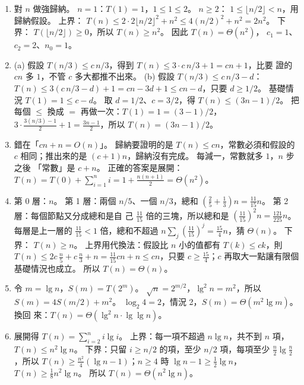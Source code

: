 \begin{enumerate}
\item 對 $n$ 做強歸納。 $n = 1$：$T(1) = 1$，$1 \le 1 \le 2$。 $n \ge 2$：
$1 \le \lfloor n/2 \rfloor < n$，用歸納假設。 上界：
$T(n) \le 2 \cdot 2\lfloor n/2 \rfloor^2 + n^2 \le 4 (n/2)^2 + n^2 = 2n^2$。 下界：
$T(\lfloor n/2 \rfloor) \ge 0$，所以 $T(n) \ge n^2$。 因此 $T(n) = \Theta(n^2)$，
$c_1 = 1$、$c_2 = 2$、$n_0 = 1$。

\item (a) 假設 $T(n/3) \le c\,n/3$，得到 $T(n) \le 3 \cdot c\,n/3 + 1 = cn + 1$，比要
證的 $cn$ 多 $1$，不管 $c$ 多大都推不出來。 (b) 假設 $T(n/3) \le c\,n/3 - d$：
$T(n) \le 3(c\,n/3 - d) + 1 = cn - 3d + 1 \le cn - d$，只要 $d \ge 1/2$。 基礎情況
$T(1) = 1 \le c - d$。 取 $d = 1/2$、$c = 3/2$，得 $T(n) \le (3n - 1)/2$。 把每個
$\le$ 換成 $=$ 再做一次：$T(1) = 1 = (3 - 1)/2$，
$3 \cdot \frac{3(n/3) - 1}{2} + 1 = \frac{3n - 1}{2}$，所以 $T(n) = (3n - 1)/2$。

\item 錯在「$cn + n = O(n)$」。 歸納要證明的是 $T(n) \le cn$，常數必須和假設的
$c$ 相同；推出來的是 $(c + 1) n$，歸納沒有完成。 每減一，常數就多 $1$，$n$ 步之後
「常數」是 $c + n$。 正確的答案是展開：
$T(n) = T(0) + \sum_{i=1}^{n} i = 1 + \frac{n(n+1)}{2} = \Theta(n^2)$。

\item 第 0 層：$n$。 第 1 層：兩個 $n/5$、一個 $n/3$，總和
$(\frac{2}{5} + \frac{1}{3}) n = \frac{11}{15} n$。 第 2 層：每個節點又分成總和是自
己 $\frac{11}{15}$ 倍的三塊，所以總和是 $(\frac{11}{15})^2 n = \frac{121}{225} n$。
每層是上一層的 $\frac{11}{15} < 1$ 倍，總和不超過
$n \sum_j (\frac{11}{15})^j = \frac{15}{4} n$，猜 $\Theta(n)$。 下界：
$T(n) \ge n$。 上界用代換法：假設比 $n$ 小的值都有 $T(k) \le ck$，則
$T(n) \le 2c\,\frac{n}{5} + c\,\frac{n}{3} + n = \frac{11}{15} cn + n \le cn$，只要
$c \ge \frac{15}{4}$；$c$ 再取大一點讓有限個基礎情況也成立。 所以
$T(n) = \Theta(n)$。

\item 令 $m = \lg n$，$S(m) = T(2^m)$。 $\sqrt{n} = 2^{m/2}$，$\lg^2 n = m^2$，所以
$S(m) = 4S(m/2) + m^2$。 $\log_2 4 = 2$，情況 2，$S(m) = \Theta(m^2 \lg m)$。 換回
來：$T(n) = \Theta(\lg^2 n \cdot \lg \lg n)$。

\item 展開得 $T(n) = \sum_{i=2}^{n} i \lg i$。 上界：每一項不超過 $n \lg n$，共不到
$n$ 項，$T(n) \le n^2 \lg n$。 下界：只留 $i \ge n/2$ 的項，至少 $n/2$ 項，每項至少
$\frac{n}{2} \lg \frac{n}{2}$，所以 $T(n) \ge \frac{n^2}{4}(\lg n - 1)$；$n \ge 4$ 時
$\lg n - 1 \ge \frac{1}{2} \lg n$，$T(n) \ge \frac{1}{8} n^2 \lg n$。 所以
$T(n) = \Theta(n^2 \lg n)$。


\end{enumerate}
